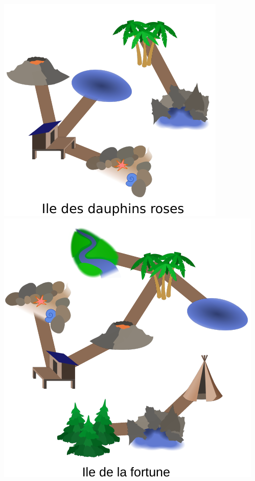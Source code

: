 \documentclass[french, landscape]{article}
\begin{document}
\centering
\includegraphics[height=\textheight]{iles/svgs/logique/1_dauphins-roses.pdf}
\newpage\includegraphics[height=\textheight]{iles/svgs/logique/2_fortune.pdf}
\end{document}
